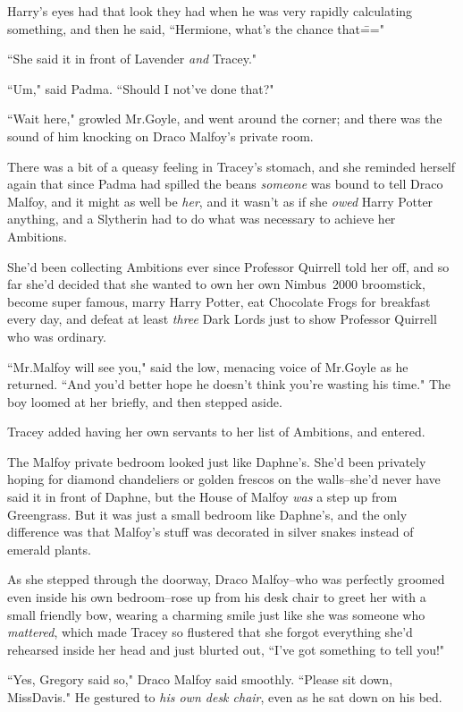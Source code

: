 Harry's eyes had that look they had when he was very rapidly calculating something, and then he said, ``Hermione, what's the chance that\==="

``She said it in front of Lavender \emph{and} Tracey."

``Um," said Padma. ``Should I not've done that?"

\later

``Wait here," growled Mr.\?Goyle, and went around the corner; and there was the sound of him knocking on Draco Malfoy's private room.

There was a bit of a queasy feeling in Tracey's stomach, and she reminded herself again that since Padma had spilled the beans \emph{someone} was bound to tell Draco Malfoy, and it might as well be \emph{her}, and it wasn't as if she \emph{owed} Harry Potter anything, and a Slytherin had to do what was necessary to achieve her Ambitions.

She'd been collecting Ambitions ever since Professor Quirrell told her off, and so far she'd decided that she wanted to own her own Nimbus~2000 broomstick, become super famous, marry Harry Potter, eat Chocolate Frogs for breakfast every day, and defeat at least \emph{three} Dark Lords just to show Professor Quirrell who was ordinary.

``Mr.\?Malfoy will see you," said the low, menacing voice of Mr.\?Goyle as he returned. ``And you'd better hope he doesn't think you're wasting his time." The boy loomed at her briefly, and then stepped aside.

Tracey added having her own servants to her list of Ambitions, and entered.

The Malfoy private bedroom looked just like Daphne's. She'd been privately hoping for diamond chandeliers or golden frescos on the walls\---she'd never have said it in front of Daphne, but the House of Malfoy \emph{was} a step up from Greengrass. But it was just a small bedroom like Daphne's, and the only difference was that Malfoy's stuff was decorated in silver snakes instead of emerald plants.

As she stepped through the doorway, Draco Malfoy\---who was perfectly groomed even inside his own bedroom\---rose up from his desk chair to greet her with a small friendly bow, wearing a charming smile just like she was someone who \emph{mattered}, which made Tracey so flustered that she forgot everything she'd rehearsed inside her head and just blurted out, ``I've got something to tell you!"

``Yes, Gregory said so," Draco Malfoy said smoothly. ``Please sit down, Miss\?Davis." He gestured to \emph{his own desk chair}, even as he sat down on his bed.

